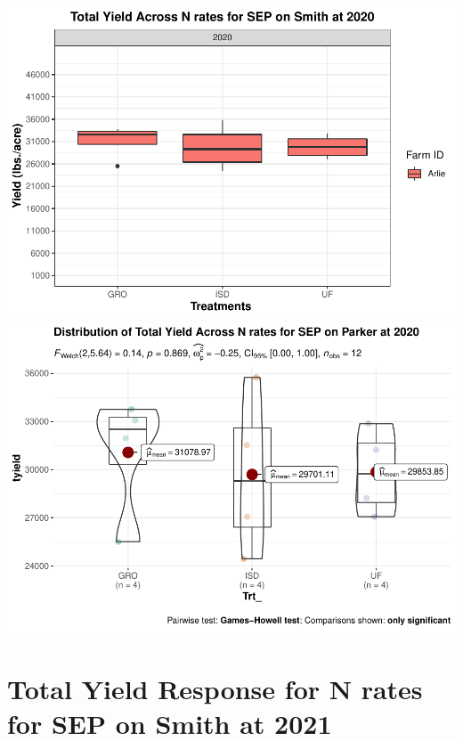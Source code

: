 \documentclass[
]{article}
\begin{document}
\includegraphics{NoffsiteT_files/figure-latex/unnamed-chunk-8-1.pdf}
\includegraphics{NoffsiteT_files/figure-latex/unnamed-chunk-8-2.pdf}

\hypertarget{total-yield-response-for-n-rates-for-sep-on-smith-at-2021}{%
\section{Total Yield Response for N rates for SEP on Smith at
2021}\label{total-yield-response-for-n-rates-for-sep-on-smith-at-2021}}
\end{document}
